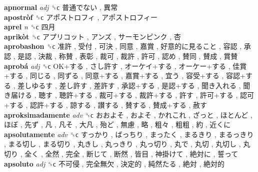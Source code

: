 \textbf{apnormal} \emph{adj}  ␝ϲ   普通でない ,  異常   \\
\textbf{apostròf} ␝ϲ   アポストロフィ ,  アポストロフィー   \\
\textbf{aprel} \emph{n}  ␝ϲ   四月   \\
\textbf{aprikòt} ␝ϲ   アプリコット ,  アンズ ,  サーモンピンク ,  杏   \\
\textbf{aprobashon} ␝ϲ   准許 ,  受付 ,  可決 ,  同意 ,  嘉賞 ,  好意的に見ること ,  容認 ,  承認 ,  是認 ,  決裁 ,  称賛 ,  表彰 ,  裁可 ,  裁許 ,  許可 ,  認め ,  賛同 ,  賛成 ,  賞賛   \\
\textbf{aprobá} \emph{adj}  ␝ϲ   OK+する ,  さし許す ,  オーケイ+する ,  オーケー+する ,  佳賞+する ,  同じる ,  同ずる ,  同意+する ,  嘉賞+する ,  宜う ,  容受+する ,  容認+する ,  差しゆるす ,  差し許す ,  差許す ,  承認+する ,  是認+する ,  聞き入れる ,  聞き届ける ,  聴す ,  聴許+する ,  裁可+する ,  裁許+する ,  許す ,  許可+する ,  認可+する ,  認許+する ,  諒する ,  讃する ,  賛する ,  賛成+する ,  赦す   \\
\textbf{aproksimadamente} \emph{adv}  ␝ϲ   おおよそ ,  およそ ,  かれこれ ,  ざっと ,  ほとんど ,  ほぼ ,  先ず ,  凡 ,  凡そ ,  大凡 ,  殆ど ,  無慮 ,  略 ,  粗々 ,  粗粗 ,  約 ,  近くに   \\
\textbf{apsolutamente} \emph{adv}  ␝ϲ   すっかり ,  ばっちり ,  まったく ,  まるきり ,  まるっきり ,  まる切し ,  まる切り ,  丸きし ,  丸っきり ,  丸っ切り ,  丸で ,  丸切 ,  丸切し ,  丸切り ,  全く ,  全然 ,  完全 ,  断じて ,  断然 ,  皆目 ,  神掛けて ,  絶対に ,  誓って   \\
\textbf{apsoluto} \emph{adj}  ␝ϲ   不可侵 ,  完全無欠 ,  決定的 ,  純然たる ,  絶対 ,  絶対的   \\
